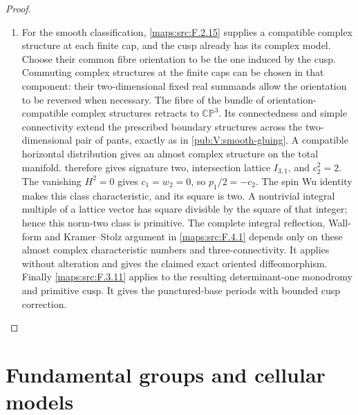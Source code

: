 \documentclass[11pt,a4paper]{article}
\numberwithin{equation}{section}
\theoremstyle{definition}
\begin{document}
\begin{proof}
\begin{enumerate}[label=\arabic*.]
\item For the smooth classification, \ref{maps:src:F.2.15} supplies a
compatible complex structure at each finite cap, and
the cusp already has its complex model.
Choose their common fibre orientation to be the one
induced by the cusp.
Commuting complex structures at the finite caps can
be chosen in that component: their two-dimensional
fixed real summands allow the orientation to be
reversed when necessary.
The fibre of the bundle of orientation-compatible
complex structures retracts to $\mathbb{CP}^3$.
Its connectedness and simple connectivity extend
the prescribed boundary structures across the
two-dimensional pair of pants, exactly as in \cref{pub:V:smooth-gluing}.
A compatible horizontal distribution gives an
almost complex structure on the total manifold.
 therefore gives signature two,
intersection lattice $I_{3,1}$, and $c_2^2=2$.
The vanishing $H^2=0$ gives $c_1=w_2=0$, so $p_1/2=-c_2$.
The spin Wu identity makes this class characteristic, and its square
is two. A nontrivial integral multiple of a lattice vector has square
divisible by the square of that integer; hence this norm-two class
is primitive.
The complete integral reflection, Wall-form and Kramer--Stolz argument in \ref{maps:src:F.4.1}
depends only on these almost complex characteristic
numbers and three-connectivity.
It applies without alteration and gives the claimed
exact oriented diffeomorphism.
Finally \ref{maps:src:F.3.11} applies to the resulting determinant-one
monodromy and primitive cusp.
It gives the punctured-base periods with bounded cusp correction.

\end{enumerate}
\end{proof}




\section{Fundamental groups and cellular models}\label{pub:V:sec-cellular}
\end{document}
